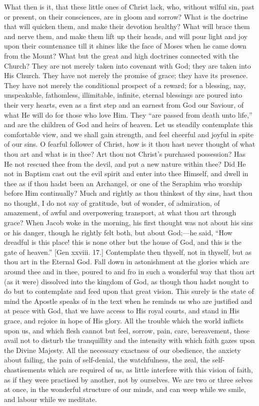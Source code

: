 What then is it, that these little ones of Christ lack, who,
without wilful sin, past or present, on their consciences, are in
gloom and sorrow? What is the doctrine that will quicken them, and
make their devotion healthy? What will brace them and nerve them, and
make them lift up their heads, and will pour light and joy upon their
countenance till it shines like the face of Moses when he came down
from the Mount? What but the great and high doctrines connected with
the Church? They are not merely taken into covenant with God; they are
taken into His Church. They have not merely the promise of grace; they
have its presence. They have not merely the conditional prospect of a
reward; for a blessing, nay, unspeakable, fathomless, illimitable,
infinite, eternal blessings are poured into their very hearts, even as
a first step and an earnest from God our Saviour, of what He will do
for those who love Him. They ``are passed from death unto
life,'' and are the children of God and heirs of heaven. Let us
steadily contemplate this comfortable view, and we shall gain strength, and feel cheerful and joyful in spite of our sins. O fearful
follower of Christ, how is it thou hast never thought of what thou art
and what is in thee? Art thou not Christ's purchased possession? Has
He not rescued thee from the devil, and put a new nature within thee?
Did He not in Baptism cast out the evil spirit and enter into thee
Himself, and dwell in thee as if thou hadst been an Archangel, or one
of the Seraphim who worship before Him continually? Much and rightly
as thou thinkest of thy sins, hast thou no thought, I do not say of
gratitude, but of wonder, of admiration, of amazement, of awful and
overpowering transport, at what thou art through grace? When Jacob
woke in the morning, his first thought was not about his sins or his
danger, though he rightly felt both, but about God;—he said,
``How dreadful is this place! this is none other but the house of
God, and this is the gate of heaven.'' [Gen xxviii. 17.]
Contemplate then thyself, not in thyself, but as thou art in the
Eternal God. Fall down in astonishment at the glories which are around
thee and in thee, poured to and fro in such a wonderful way that thou
art (as it were) dissolved into the kingdom of God, as though thou
hadst nought to do but to contemplate and feed upon that great vision.
This surely is the state of mind the Apostle speaks of in the text
when he reminds us who are justified and at peace with God, that we
have access to His royal courts, and stand in His grace, and rejoice
in hope of His glory. All the trouble which the world inflicts upon
us, and which flesh cannot but feel, sorrow, pain, care, bereavement,
these avail not to disturb the tranquillity and the intensity with
which faith gazes upon the Divine Majesty. All the necessary exactness
of our obedience, the anxiety about failing, the pain of self-denial,
the watchfulness, the zeal, the self-chastisements which are required
of us, as little interfere with this vision of faith, as if they were
practised by another, not by ourselves. We are two or three selves at
once, in the wonderful structure of our minds, and can weep while we
smile, and labour while we meditate.

